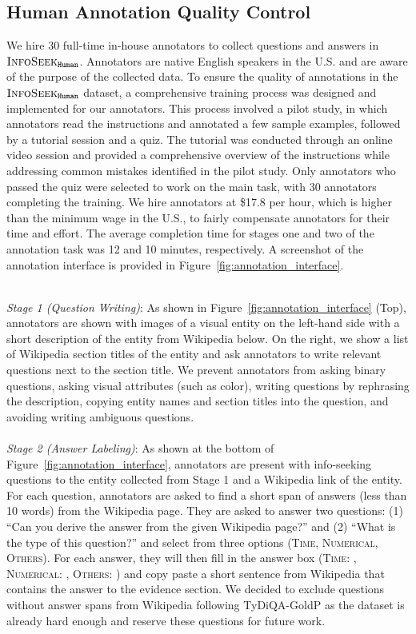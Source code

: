 \documentclass[11pt]{article}
\begin{document}
\subsection{Human Annotation Quality Control}
We hire 30 full-time in-house annotators to collect questions and answers in $\textsc{InfoSeek}_{\texttt{Human}}$. Annotators are native English speakers in the U.S. and are aware of the purpose of the collected data.
To ensure the quality of annotations in the $\textsc{InfoSeek}_{\texttt{Human}}$ dataset, a comprehensive training process was designed and implemented for our annotators. This process involved a pilot study, in which annotators read the instructions and annotated a few sample examples, followed by a tutorial session and a quiz. The tutorial was conducted through an online video session and provided a comprehensive overview of the instructions while addressing common mistakes identified in the pilot study. Only annotators who passed the quiz were selected to work on the main task, with 30 annotators completing the training. 
We hire annotators at \$17.8 per hour, which is higher than the minimum wage in the U.S., to fairly compensate annotators for their time and effort. The average completion time for stages one and two of the annotation task was 12 and 10 minutes, respectively. A screenshot of the annotation interface is provided in Figure~\ref{fig:annotation_interface}.

\\
\textit{Stage 1 (Question Writing)}: As shown in Figure~\ref{fig:annotation_interface} (Top), annotators are shown with images of a visual entity on the left-hand side with a short description of the entity from Wikipedia below. On the right, we show a list of Wikipedia section titles of the entity and ask annotators to write relevant questions next to the section title. We prevent annotators from asking binary questions, asking visual attributes (such as color), writing questions by rephrasing the description, copying entity names and section titles into the question, and avoiding writing ambiguous questions.
\\\\
\textit{Stage 2 (Answer Labeling)}: As shown at the bottom of Figure~\ref{fig:annotation_interface}, annotators are present with info-seeking questions to the entity collected from Stage 1 and a Wikipedia link of the entity. For each question, annotators are asked to find a short span of answers (less than 10 words) from the Wikipedia page. They are asked to answer two questions: (1) ``Can you derive the answer from the given Wikipedia page?'' and (2) ``What is the type of this question?'' and select from three options (\textsc{Time}, \textsc{Numerical}, \textsc{Others}).
For each answer, they will then fill in the answer box (\textsc{Time}: , \textsc{Numerical}: , \textsc{Others}: \snlp{[string]}) and copy paste a short sentence from Wikipedia that contains the answer to the evidence section.
We decided to exclude questions without answer spans from Wikipedia following TyDiQA-GoldP as the dataset is already hard enough and reserve these questions for future work.
\end{document}
